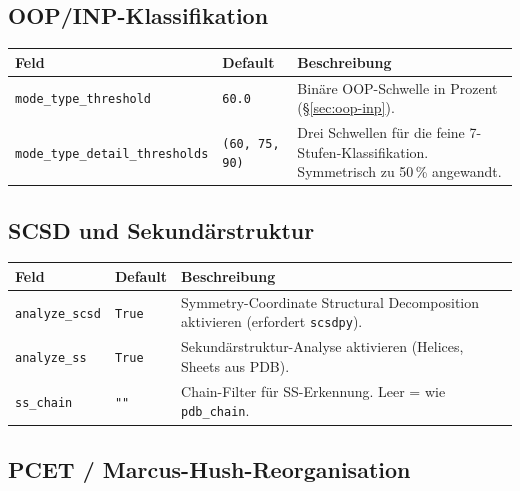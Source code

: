 \documentclass[11pt,a4paper,twoside]{article}
\theoremstyle{remark}
\begin{document}
\subsection{OOP/INP-Klassifikation}

\begin{longtable}{p{} p{} p{}}
\toprule
\textbf{Feld} & \textbf{Default} & \textbf{Beschreibung} \\
\midrule
\endhead
\texttt{mode\_type\_threshold} & \texttt{60.0} & Bin\"are OOP-Schwelle in
  Prozent (\S\ref{sec:oop-inp}). \\
\texttt{mode\_type\_detail\_thresholds} & \texttt{(60, 75, 90)} & Drei
  Schwellen f\"ur die feine 7-Stufen-Klassifikation. Symmetrisch zu 50\,\%
  angewandt. \\
\bottomrule
\end{longtable}

\subsection{SCSD und Sekund\"arstruktur}

\begin{longtable}{p{} p{} p{}}
\toprule
\textbf{Feld} & \textbf{Default} & \textbf{Beschreibung} \\
\midrule
\endhead
\texttt{analyze\_scsd}  & \texttt{True} & Symmetry-Coordinate
  Structural Decomposition aktivieren (erfordert \texttt{scsdpy}). \\
\texttt{analyze\_ss}    & \texttt{True} & Sekund\"arstruktur-Analyse
  aktivieren (Helices, Sheets aus PDB). \\
\texttt{ss\_chain}      & \texttt{""}   & Chain-Filter f\"ur
  SS-Erkennung. Leer = wie \texttt{pdb\_chain}. \\
\bottomrule
\end{longtable}

\subsection{PCET / Marcus-Hush-Reorganisation}
\end{document}
